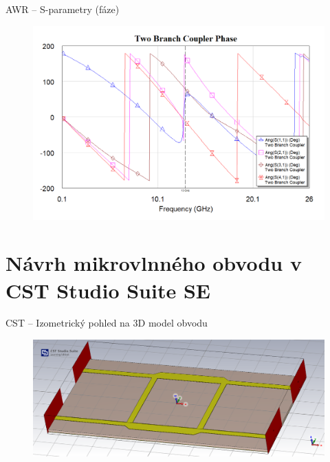 \documentclass[aspectratio=169, 11pt, hyperref={unicode}]{beamer}
\begin{document}
\begin{frame}{AWR -- S-parametry (fáze)}
	\begin{figure}[!ht]
		\centering
		\includegraphics[width=.7\textwidth]{src/AWR_S-parameters_phase.png}
	\end{figure}
\end{frame}

\section{Návrh mikrovlnného obvodu v CST Studio Suite SE}
\begin{frame}{CST -- Izometrický pohled na 3D model obvodu}
	\begin{figure}[!ht]
		\centering
		\includegraphics[width=.8\textwidth]{src/CST_3D-isometric.png}
	\end{figure}
\end{frame}
\end{document}
